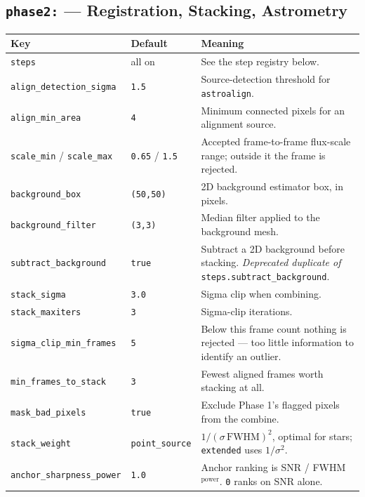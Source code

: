 \documentclass[11pt,a4paper]{article}
\begin{document}
\subsection{\texttt{phase2:} --- Registration, Stacking, Astrometry}
\begin{center}
\begin{longtable}{|p{4.6cm}|p{1.9cm}|p{8.0cm}|}
\hline
\textbf{Key} & \textbf{Default} & \textbf{Meaning} \\
\hline
\endhead
\texttt{steps} & all on & See the step registry below. \\
\hline
\texttt{align\_detection\_sigma} & \texttt{1.5} & Source-detection threshold for \texttt{astroalign}. \\
\hline
\texttt{align\_min\_area} & \texttt{4} & Minimum connected pixels for an alignment source. \\
\hline
\texttt{scale\_min} / \texttt{scale\_max} & \texttt{0.65} / \texttt{1.5} & Accepted frame-to-frame flux-scale range; outside it the frame is rejected. \\
\hline
\texttt{background\_box} & \texttt{(50,50)} & 2D background estimator box, in pixels. \\
\hline
\texttt{background\_filter} & \texttt{(3,3)} & Median filter applied to the background mesh. \\
\hline
\texttt{subtract\_background} & \texttt{true} & Subtract a 2D background before stacking. \emph{Deprecated duplicate of} \texttt{steps.subtract\_background}. \\
\hline
\texttt{stack\_sigma} & \texttt{3.0} & Sigma clip when combining. \\
\hline
\texttt{stack\_maxiters} & \texttt{3} & Sigma-clip iterations. \\
\hline
\texttt{sigma\_clip\_min\_frames} & \texttt{5} & Below this frame count nothing is rejected --- too little information to identify an outlier. \\
\hline
\texttt{min\_frames\_to\_stack} & \texttt{3} & Fewest aligned frames worth stacking at all. \\
\hline
\texttt{mask\_bad\_pixels} & \texttt{true} & Exclude Phase 1's flagged pixels from the combine. \\
\hline
\texttt{stack\_weight} & \texttt{point\_source} & $1/(\sigma\,\mathrm{FWHM})^2$, optimal for stars; \texttt{extended} uses $1/\sigma^2$. \\
\hline
\texttt{anchor\_sharpness\_power} & \texttt{1.0} & Anchor ranking is SNR / FWHM$^{\text{power}}$. \texttt{0} ranks on SNR alone. \\

\end{longtable}
\end{center}
\end{document}
